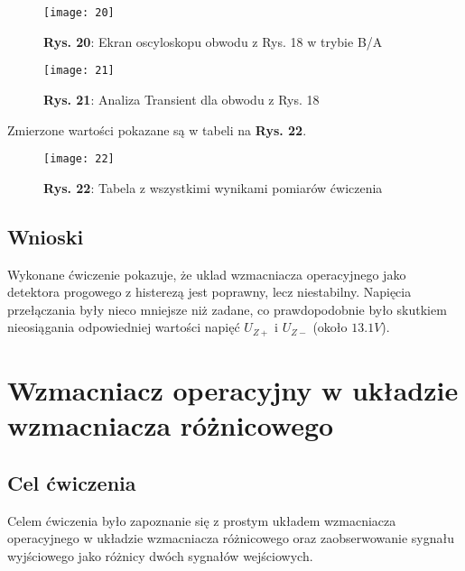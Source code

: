 \documentclass[11pt]{article}
\begin{document}
\begin{figure}[H]
\centering
\texttt{[image: 20]}
\caption*{\textbf{Rys. 20}: Ekran oscyloskopu obwodu z Rys. 18 w trybie B/A}
\end{figure}
\begin{figure}[H]
\centering
\texttt{[image: 21]}
\caption*{\textbf{Rys. 21}: Analiza Transient dla obwodu z Rys. 18}
\end{figure}
Zmierzone wartości pokazane są w tabeli na \textbf{Rys. 22}.
\begin{figure}[H]
\centering
\texttt{[image: 22]}
\caption*{\textbf{Rys. 22}: Tabela z wszystkimi wynikami pomiarów ćwiczenia}
\end{figure}
\subsection{Wnioski}
Wykonane ćwiczenie pokazuje, że uklad wzmacniacza operacyjnego jako detektora progowego z histerezą jest poprawny, lecz niestabilny. Napięcia przełączania były nieco mniejsze niż zadane, co prawdopodobnie było skutkiem nieosiągania odpowiedniej wartości napięć $U_{Z+}$ i $U_{Z-}$ (około $13.1V$).
\section{Wzmacniacz operacyjny w układzie wzmacniacza różnicowego}
\subsection{Cel ćwiczenia}
Celem ćwiczenia było zapoznanie się z prostym układem wzmacniacza operacyjnego w układzie wzmacniacza różnicowego oraz zaobserwowanie sygnału wyjściowego jako różnicy dwóch sygnałów wejściowych.
\end{document}
